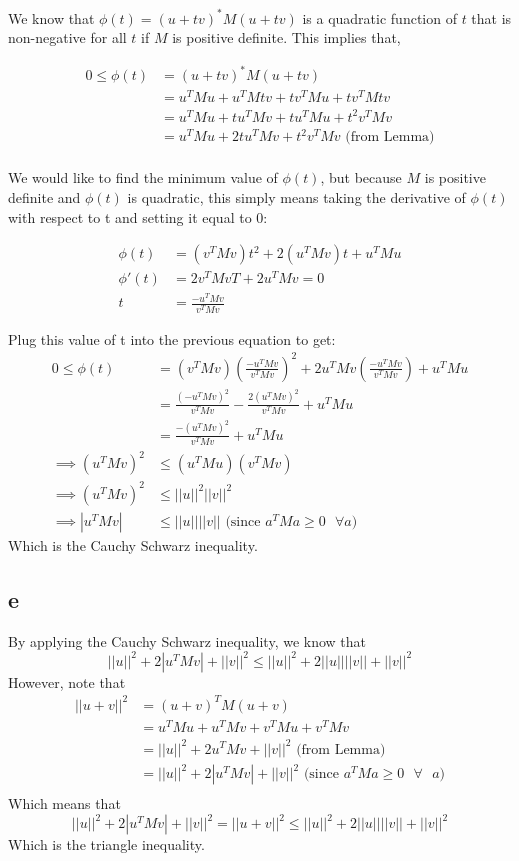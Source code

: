 \documentclass[11pt]{amsart}
\begin{document}
We know that $\phi (t) = (u+tv)^*M(u+tv) $ is a quadratic function of $t$ that is non-negative for all $t$ if $M$ is positive definite. This implies that,

\begin{align*}
0 \le \phi (t) &= (u+tv)^*M(u+tv)\\
&= u^TMu + u^TMtv + tv^TMu + tv^TMtv\\ 
&= u^TMu + tu^TMv + tu^TMu + t^2v^TMv\\
&= u^TMu + 2tu^TMv + t^2v^TMv \text{ (from Lemma)}\\
\end{align*}

We would like to find the minimum value of $\phi (t)$, but because $M$ is positive definite and $\phi (t)$ is quadratic, this simply means taking the derivative of $\phi (t)$ with respect to t and setting it equal to 0:

\begin{align*}
\phi (t) &= (v^TMv)t^2 + 2(u^TMv)t + u^TMu\\
\phi '(t) &= 2v^TMvT + 2u^TMv = 0\\
t &= \frac{-u^TMv}{v^TMv}
\end{align*}

Plug this value of t into the previous equation to get:
\begin{align*}
0 \le \phi (t) &= (v^TMv)(\frac{-u^TMv}{v^TMv})^2 + 2u^TMv(\frac{-u^TMv}{v^TMv}) + u^TMu\\
&= \frac{(-u^TMv)^2}{v^TMv} - \frac{2(u^TMv)^2}{v^TMv} + u^TMu\\
&= \frac{-(u^TMv)^2}{v^TMv} + u^TMu\\
\implies (u^TMv)^2 &\le (u^TMu)(v^TMv)\\
\implies (u^TMv)^2 &\le ||u||^2||v||^2\\
\implies |u^TMv| &\le ||u||||v|| \text{ (since $a^TMa \ge 0$ $\forall a$)}
\end{align*}
Which is the Cauchy Schwarz inequality.

\subsection*{e}
By applying the Cauchy Schwarz inequality, we know that
\[
||u||^2 + 2|u^TMv| + ||v||^2 \le ||u||^2 + 2||u||||v||+ ||v||^2
\]
However, note that
\begin{align*}
||u+v||^2 &= (u+v)^TM(u+v)\\
&= u^TMu + u^TMv + v^TMu + v^TMv\\
&= ||u||^2 + 2u^TMv + ||v||^2 \text{ (from Lemma)}\\
&= ||u||^2 + 2|u^TMv| + ||v||^2 \text{ (since $a^TMa \ge 0$ $\forall$ $a$)}\\
\end{align*}
Which means that 
\[
 ||u||^2 + 2|u^TMv| + ||v||^2 = ||u + v||^2 \le ||u||^2 + 2||u||||v||+ ||v||^2
\]
Which is the triangle inequality.
\end{document}
